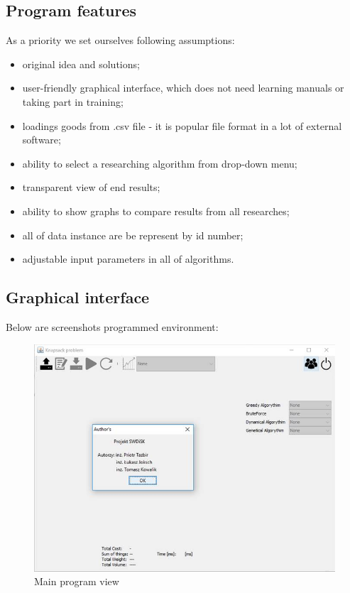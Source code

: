 \documentclass[conference,compsoc]{IEEEtran}
\begin{document}
\subsection{Program features}
As a priority we set ourselves following assumptions:
\begin{itemize}
\item original idea and solutions;
\item user-friendly graphical interface, which does not need learning manuals or taking part in training;
\item loadings goods from .csv file - it is popular file format in a lot of external software; 
\item ability to select a researching algorithm from drop-down menu;
\item transparent view of end results;
\item ability to show graphs to compare results from all researches;
\item all of data instance are be represent by id number;
\item adjustable input parameters in all of algorithms.
\end{itemize}

\subsection{Graphical interface}
Below are screenshots programmed environment:

\begin{figure}[H]
  \centering
  \includegraphics[width=\columnwidth]{image002p.jpg}
  \caption{Main program view }
\end{figure}
\end{document}
